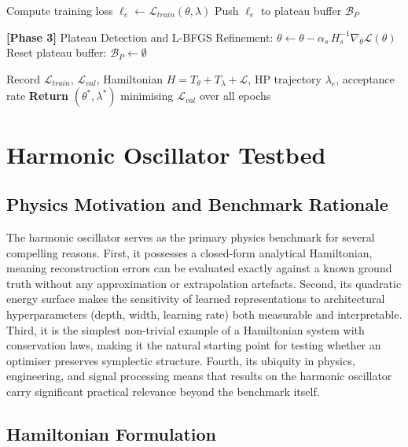 \documentclass[11pt]{article}
\begin{document}
\begin{algorithm}[H]
\begin{algorithmic}[1]
  \State Compute training loss $\ell_e \leftarrow \mathcal{L}_{train}(\theta,\lambda)$
  \State Push $\ell_e$ to plateau buffer $\mathcal{B}_P$

  \State \textbf{[Phase 3]} Plateau Detection and L-BFGS Refinement:
      \State $\theta \leftarrow \theta - \alpha_s\,H_s^{-1}\nabla_\theta\mathcal{L}(\theta)$
    \EndFor
    \State Reset plateau buffer: $\mathcal{B}_P \leftarrow \emptyset$
  \EndIf

  \State Record $\mathcal{L}_{train}$, $\mathcal{L}_{val}$,
         Hamiltonian $H = T_\theta+T_\lambda+\mathcal{L}$,
         HP trajectory $\lambda_e$, acceptance rate
\EndFor
\State \textbf{Return} $(\theta^*, \lambda^*)$ minimising $\mathcal{L}_{val}$ over all epochs
\end{algorithmic}
\end{algorithm}

\newpage
\section{Harmonic Oscillator Testbed}

\subsection{Physics Motivation and Benchmark Rationale}

The harmonic oscillator serves as the primary physics benchmark for
several compelling reasons.  First, it possesses a closed-form
analytical Hamiltonian, meaning reconstruction errors can be evaluated
exactly against a known ground truth without any approximation or
extrapolation artefacts.  Second, its quadratic energy surface makes the
sensitivity of learned representations to architectural hyperparameters
(depth, width, learning rate) both measurable and interpretable.  Third,
it is the simplest non-trivial example of a Hamiltonian system with
conservation laws, making it the natural starting point for testing
whether an optimiser preserves symplectic structure.  Fourth, its
ubiquity in physics, engineering, and signal processing means that
results on the harmonic oscillator carry significant practical relevance
beyond the benchmark itself.

\subsection{Hamiltonian Formulation}
\end{document}
